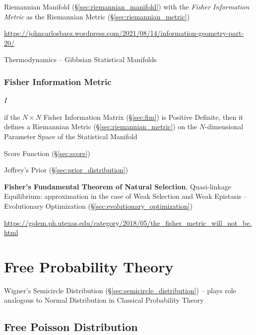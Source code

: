 Riemannian Manifold (\S\ref{sec:riemannian_manifold}) with the
\emph{Fisher Information Metric} as the Riemannian Metric
(\S\ref{sec:riemannian_metric})

\url{https://johncarlosbaez.wordpress.com/2021/08/14/information-geometry-part-20/}

Thermodynamics -- Gibbsian Statistical Manifolds



\subsubsection{Fisher Information Metric}\label{sec:fisher_metric}

$I$

if the $N \times N$ Fisher Information Matrix (\S\ref{sec:fim}) is Positive
Definite, then it defines a Riemannian Metric (\S\ref{sec:riemannian_metric}) on
the $N$-dimensional Parameter Space of the Statistical Manifold

Score Function (\S\ref{sec:score})

Jeffrey's Prior (\S\ref{sec:prior_distribution})

\fist \textbf{Fisher's Fundamental Theorem of Natural Selection},
Quasi-linkage Equilibrium: approximation in the case of Weak Selection
and Weak Epistasis -- Evolutionary Optimization
(\S\ref{sec:evolutionary_optimization}) %

\url{https://golem.ph.utexas.edu/category/2018/05/the_fisher_metric_will_not_be.html}



\section{Free Probability Theory}\label{sec:free_probability}

Wigner's Semicircle Distribution (\S\ref{sec:semicircle_distribution}) -- plays
role analogous to Normal Distribution in Classical Probability Theory



\subsection{Free Poisson Distribution}\label{sec:free_poisson}

